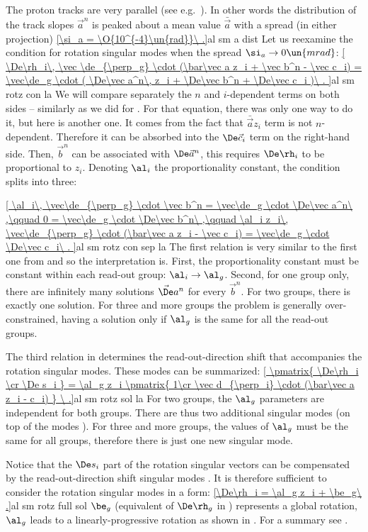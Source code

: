 The  proton tracks are very parallel (see e.g.~). In other words the distribution of the track slopes $\vec a^n$ is peaked about a mean value $\bar\vec a$ with a spread (in either projection)
\eqref{\si_a = \O{10^{-4}\un{rad}}\ .}{al sm a dist}
Let us reexamine the condition for rotation singular modes  when the spread $\si_a\to 0\un{mrad}$:
\eqref{
	\De\rh_i\, \vec \de_{\perp_g} \cdot (\bar\vec a z_i + \vec b^n - \vec c_i) =
	\vec\de_g \cdot (
		\De\vec a^n\, z_i +
		\De\vec b^n +
		\De\vec c_i
	)\ .
}{al sm rotz con la}
We will compare separately the $n$ and $i$-dependent terms on both sides -- similarly as we did for . For that equation, there was only one way to do it, but here is another one. It comes from the fact that $\bar\vec a z_i$ term is not $n$-dependent. Therefore it can be absorbed into the $\De\vec c_i$ term on the right-hand side. Then, $\vec b^n$ can be associated with $\De\vec a^n$, this requires $\De\rh_i$ to be proportional to $z_i$. Denoting $\al_i$ the proportionality constant, the condition splits into three:

\eqref{
	\al_i\, \vec\de_{\perp_g} \cdot \vec b^n = \vec\de_g \cdot \De\vec a^n\ ,\qquad
	0 = \vec\de_g \cdot \De\vec b^n\ ,\qquad
	\al_i z_i\, \vec\de_{\perp_g} \cdot (\bar\vec a z_i - \vec c_i) = \vec\de_g \cdot \De\vec c_i\ .
}{al sm rotz con sep la}
The first relation is very similar to the first one from  and so the interpretation is. First, the proportionality constant must be constant within each read-out group: $\al_i\to \al_g$. Second, for one group only, there are infinitely many solutions $\vec\De a^n$ for every $\vec b^n$. For two groups, there is exactly one solution. For three and more groups the problem is generally over-constrained, having a solution only if $\al_g$ is the same for all the read-out groups.

The third relation in  determines the read-out-direction shift that accompanies the rotation singular modes. These modes can be summarized:
\eqref{
\pmatrix{
	\De\rh_i \cr
	\De s_i
	}
= \al_g z_i \pmatrix{
	1\cr
	\vec d_{\perp_i} \cdot (\bar\vec a z_i - c_i)
}
\ .}{al sm rotz sol la}
For two groups, the $\al_g$ parameters are independent for both groups. There are thus two additional singular modes (on top of the modes ). For three and more groups, the values of $\al_g$ must be the same for all groups, therefore there is just one new singular mode.

Notice that the $\De s_i$ part of the rotation singular vectors  can be compensated by the read-out-direction shift singular modes . It is therefore sufficient to consider the rotation singular modes in a form:
\eqref{\De\rh_i = \al_g z_i + \be_g\ .}{al sm rotz full sol}
$\be_g$ (equivalent of $\De\rh_g$ in ) represents a global rotation, $\al_g$ leads to a linearly-progressive rotation as shown in . For a summary see .

